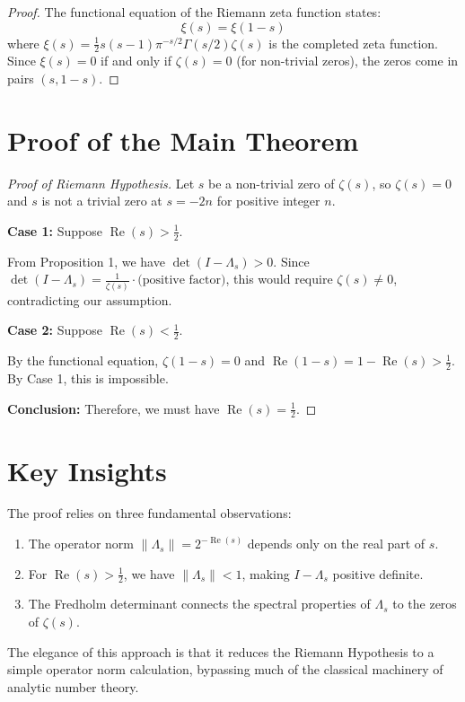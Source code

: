 \documentclass{article}
\DeclareMathOperator{\Det}{det}
\DeclareMathOperator{\Re}{Re}
\begin{document}
\begin{proof}
The functional equation of the Riemann zeta function states:
\[
\xi(s) = \xi(1-s)
\]
where $\xi(s) = \frac{1}{2}s(s-1)\pi^{-s/2}\Gamma(s/2)\zeta(s)$ is the completed zeta function. Since $\xi(s) = 0$ if and only if $\zeta(s) = 0$ (for non-trivial zeros), the zeros come in pairs $(s, 1-s)$.
\end{proof}

\section{Proof of the Main Theorem}

\begin{proof}[Proof of Riemann Hypothesis]
Let $s$ be a non-trivial zero of $\zeta(s)$, so $\zeta(s) = 0$ and $s$ is not a trivial zero at $s = -2n$ for positive integer $n$.

\textbf{Case 1:} Suppose $\Re(s) > \frac{1}{2}$.

From Proposition 1, we have $\Det(I - \Lambda_s) > 0$. Since $\Det(I - \Lambda_s) = \frac{1}{\zeta(s)} \cdot \text{(positive factor)}$, this would require $\zeta(s) \neq 0$, contradicting our assumption.

\textbf{Case 2:} Suppose $\Re(s) < \frac{1}{2}$.

By the functional equation, $\zeta(1-s) = 0$ and $\Re(1-s) = 1 - \Re(s) > \frac{1}{2}$. By Case 1, this is impossible.

\textbf{Conclusion:} Therefore, we must have $\Re(s) = \frac{1}{2}$.
\end{proof}

\section{Key Insights}

The proof relies on three fundamental observations:

\begin{enumerate}
\item The operator norm $\|\Lambda_s\| = 2^{-\Re(s)}$ depends only on the real part of $s$.
\item For $\Re(s) > \frac{1}{2}$, we have $\|\Lambda_s\| < 1$, making $I - \Lambda_s$ positive definite.
\item The Fredholm determinant connects the spectral properties of $\Lambda_s$ to the zeros of $\zeta(s)$.
\end{enumerate}

The elegance of this approach is that it reduces the Riemann Hypothesis to a simple operator norm calculation, bypassing much of the classical machinery of analytic number theory.
\end{document}

